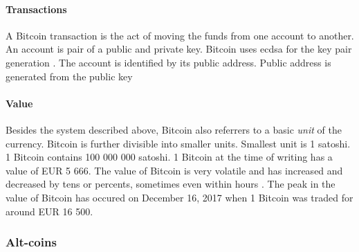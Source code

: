 \paragraph{Transactions}
A Bitcoin transaction is the act of moving the funds from one account to another. An account is pair of a public and private key. Bitcoin uses \acrfull{ecdsa} for the key pair generation \cite{Decker2013InformationNetwork}. The account is identified by its public address. Public address is generated from the public key 




\paragraph{Value}
Besides the system described above, Bitcoin also referrers to a basic \textit{unit} of the currency. Bitcoin is further divisible into smaller units. Smallest unit is 1 satoshi. 1 Bitcoin contains 100 000 000 satoshi. 1 Bitcoin at the time of writing has a value of EUR 5 666. The value of Bitcoin is very volatile and has increased and decreased by tens or percents, sometimes even within hours \cite{Adkisson2018WhyVolatile}. The peak in the value of Bitcoin has occured on December 16, 2017 when 1 Bitcoin was traded for around EUR 16 500.

\subsubsection{Alt-coins}

